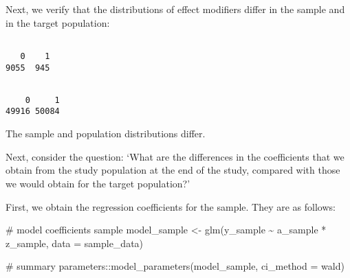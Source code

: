 \documentclass[
  single column]{article}
\newenvironment{Shaded}{\begin{snugshade}}{\end{snugshade}}
\newcommand{\AttributeTok}[1]{\textcolor[rgb]{0.40,0.45,0.13}{#1}}
\newcommand{\CommentTok}[1]{\textcolor[rgb]{0.37,0.37,0.37}{#1}}
\newcommand{\FunctionTok}[1]{\textcolor[rgb]{0.28,0.35,0.67}{#1}}
\newcommand{\NormalTok}[1]{\textcolor[rgb]{0.00,0.23,0.31}{#1}}
\newcommand{\OtherTok}[1]{\textcolor[rgb]{0.00,0.23,0.31}{#1}}
\newcommand{\SpecialCharTok}[1]{\textcolor[rgb]{0.37,0.37,0.37}{#1}}
\newcommand{\StringTok}[1]{\textcolor[rgb]{0.13,0.47,0.30}{#1}}
\begin{document}
Next, we verify that the distributions of effect modifiers differ in the
sample and in the target population:

\begin{Shaded}
\end{Shaded}

\begin{verbatim}

   0    1 
9055  945 
\end{verbatim}

\begin{Shaded}
\end{Shaded}

\begin{verbatim}

    0     1 
49916 50084 
\end{verbatim}

The sample and population distributions differ.

Next, consider the question: `What are the differences in the
coefficients that we obtain from the study population at the end of the
study, compared with those we would obtain for the target population?'

First, we obtain the regression coefficients for the sample. They are as
follows:

\begin{Shaded}
\begin{Highlighting}[]
\CommentTok{\# model coefficients sample}
\NormalTok{model\_sample  }\OtherTok{\textless{}{-}} \FunctionTok{glm}\NormalTok{(y\_sample }\SpecialCharTok{\textasciitilde{}}\NormalTok{ a\_sample }\SpecialCharTok{*}\NormalTok{ z\_sample, }
  \AttributeTok{data =}\NormalTok{ sample\_data)}

\CommentTok{\# summary}
\NormalTok{parameters}\SpecialCharTok{::}\FunctionTok{model\_parameters}\NormalTok{(model\_sample, }\AttributeTok{ci\_method =} \StringTok{\textquotesingle{}wald\textquotesingle{}}\NormalTok{)}
\end{Highlighting}
\end{Shaded}
\end{document}
